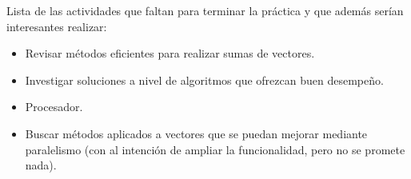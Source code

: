 \documentclass[%
	final,
	notitlepage,
	narroweqnarray,
	inline,
	twoside,
	]{ieee}
\begin{document}
Lista de las actividades que faltan para terminar la práctica y
que además serían interesantes realizar:
\begin{itemize}
\item Revisar métodos eficientes para realizar sumas de vectores.
\item Investigar soluciones a nivel de algoritmos que ofrezcan buen desempeño.
\item Procesador.
\item Buscar métodos aplicados a vectores que se puedan mejorar mediante paralelismo (con al intención de ampliar la
funcionalidad, pero no se promete nada).
\end{itemize}





\end{document}
